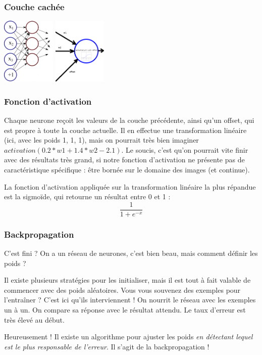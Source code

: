 \documentclass[compress]{beamer}
\begin{document}
			\begin{frame}
				\frametitle{Couche cachée}
				\hspace{6em}%
				\vspace{6em}
				\includegraphics[height=120px]{img/hidden_layer}\hspace{2em}%
				\includegraphics[height=120px]{img/neurone}
				\vspace{-4em}				
			\end{frame}
			
			\begin{frame}
				\frametitle{Fonction d'activation}
				Chaque neurone reçoit les valeurs de la couche précédente, ainsi qu'un offset, qui est propre à toute la couche actuelle.
				Il en effectue une transformation linéaire (ici, avec les poids 1, 1, 1), mais on pourrait très bien imaginer $activation(0.2*w1 + 1.4*w2 - 2.1)$.
				Le soucis, c'est qu'on pourrait vite finir avec des résultats très grand, si notre fonction d'activation ne présente pas de caractéristique spécifique : être bornée sur le domaine des images (et continue).
				
				La fonction d'activation appliquée sur la transformation linéaire la plus répandue est la sigmoïde, qui retourne un résultat entre 0 et 1 : 
				$$  \frac{1}{1 + e^{-x}} $$				
			\end{frame}

			
			\begin{frame}
				\frametitle{Backpropagation}
				\begin{alertblock}{C'est fini ?}
					On a un réseau de neurones, c'est bien beau, mais comment définir les poids ?
				\end{alertblock}
				
				Il existe plusieurs stratégies pour les initialiser, mais il est tout à fait valable de commencer avec des poids aléatoires.
				Vous vous souvenez des exemples pour l'entraîner ? C'est ici qu'ils interviennent ! On nourrit le réseau avec les exemples un à un. On compare sa réponse avec le résultat attendu. Le taux d'erreur est très élevé au début.
				
				Heureusement ! Il existe un algorithme pour ajuster les poids \emph{en détectant lequel est le plus responsable de l'erreur}. Il s'agit de la backpropagation !				
			\end{frame}
\end{document}
